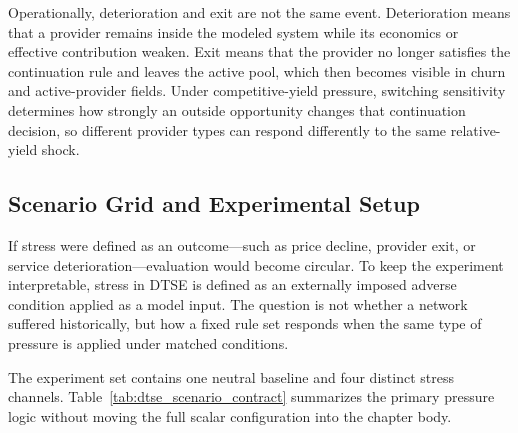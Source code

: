 Operationally, deterioration and exit are not the same event. Deterioration means that a provider remains inside the modeled system while its economics or effective contribution weaken. Exit means that the provider no longer satisfies the continuation rule and leaves the active pool, which then becomes visible in churn and active-provider fields. Under competitive-yield pressure, switching sensitivity determines how strongly an outside opportunity changes that continuation decision, so different provider types can respond differently to the same relative-yield shock.

\subsection{Scenario Grid and Experimental Setup}
\label{sec:stress_scenarios}
If stress were defined as an outcome—such as price decline, provider exit, or service deterioration—evaluation would become circular. To keep the experiment interpretable, stress in DTSE is defined as an externally imposed adverse condition applied as a model input. The question is not whether a network suffered historically, but how a fixed rule set responds when the same type of pressure is applied under matched conditions.

\label{subsec:dtse_scenario_set}
The experiment set contains one neutral baseline and four distinct stress channels. Table~\ref{tab:dtse_scenario_contract} summarizes the primary pressure logic without moving the full scalar configuration into the chapter body.


